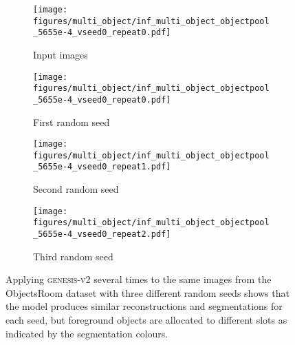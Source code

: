 \documentclass{article}
\begin{document}
\begin{figure}[h!]
	\centering
	\begin{subfigure}{\linewidth}
        \texttt{[image: figures/multi\_object/inf\_multi\_object\_objectpool\_5655e-4\_vseed0\_repeat0.pdf]}
        \caption{Input images}
        \vspace{6pt}
	\end{subfigure}
	\begin{subfigure}{\linewidth}
        \texttt{[image: figures/multi\_object/inf\_multi\_object\_objectpool\_5655e-4\_vseed0\_repeat0.pdf]}
        \caption{First random seed}
        \vspace{6pt}
	\end{subfigure}
	\begin{subfigure}{\linewidth}
        \texttt{[image: figures/multi\_object/inf\_multi\_object\_objectpool\_5655e-4\_vseed0\_repeat1.pdf]}
        \caption{Second random seed}
        \vspace{6pt}
	\end{subfigure}
	\begin{subfigure}{\linewidth}
        \texttt{[image: figures/multi\_object/inf\_multi\_object\_objectpool\_5655e-4\_vseed0\_repeat2.pdf]}
        \caption{Third random seed}
        \vspace{6pt}
	\end{subfigure}
	\caption{Applying \textsc{genesis-v2} several times to the same images from the ObjectsRoom dataset with three different random seeds shows that the model produces similar reconstructions and segmentations for each seed, but foreground objects are allocated to different slots as indicated by the segmentation colours.}
\end{figure}
\end{document}
